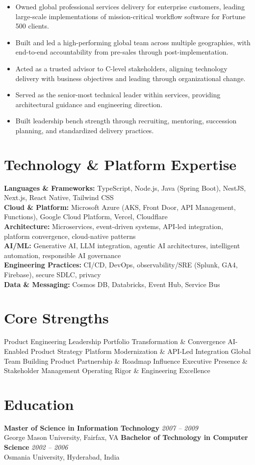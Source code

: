 \documentclass[11pt]{article}
\begin{document}
\begin{itemize}
  \item Owned global professional services delivery for enterprise customers, leading large-scale implementations of mission-critical workflow software for Fortune 500 clients.
  \item Built and led a high-performing global team across multiple geographies, with end-to-end accountability from pre-sales through post-implementation.
  \item Acted as a trusted advisor to C-level stakeholders, aligning technology delivery with business objectives and leading through organizational change.
  \item Served as the senior-most technical leader within services, providing architectural guidance and engineering direction.
  \item Built leadership bench strength through recruiting, mentoring, succession planning, and standardized delivery practices.
\end{itemize}

\section*{Technology \& Platform Expertise}
\textbf{Languages \& Frameworks:} TypeScript, Node.js, Java (Spring Boot), NestJS, Next.js, React Native, Tailwind CSS \\
\textbf{Cloud \& Platform:} Microsoft Azure (AKS, Front Door, API Management, Functions), Google Cloud Platform, Vercel, Cloudflare \\
\textbf{Architecture:} Microservices, event-driven systems, API-led integration, platform convergence, cloud-native patterns \\
\textbf{AI/ML:} Generative AI, LLM integration, agentic AI architectures, intelligent automation, responsible AI governance \\
\textbf{Engineering Practices:} CI/CD, DevOps, observability/SRE (Splunk, GA4, Firebase), secure SDLC, privacy \\
\textbf{Data \& Messaging:} Cosmos DB, Databricks, Event Hub, Service Bus

\section*{Core Strengths}
Product Engineering Leadership \textbullet{} Portfolio Transformation \& Convergence \textbullet{} AI-Enabled Product Strategy \textbullet{} Platform Modernization \& API-Led Integration \textbullet{} Global Team Building \textbullet{} Product Partnership \& Roadmap Influence \textbullet{} Executive Presence \& Stakeholder Management \textbullet{} Operating Rigor \& Engineering Excellence

\section*{Education}
\textbf{Master of Science in Information Technology} \hfill \textit{2007 -- 2009} \\
George Mason University, Fairfax, VA
\newline
\textbf{Bachelor of Technology in Computer Science} \hfill \textit{2002 -- 2006} \\
Osmania University, Hyderabad, India
\end{document}
